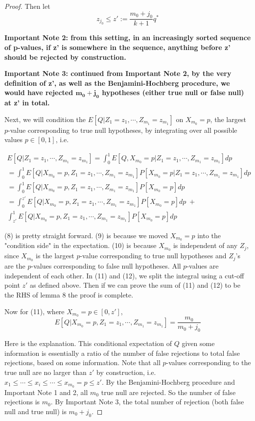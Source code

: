 \documentclass[12pt]{article}
\theoremstyle{plain}
\theoremstyle{definition}
\theoremstyle{remark}
\begin{document}
\begin{proof}
Then let\[
z_{j_0}\leq z':=\frac{m_0+j_0}{k+1}q^*
\]

\textbf{Important Note 2: from this setting, in an increasingly sorted sequence of p-values, if z' is somewhere in the sequence, anything before z' should be rejected by construction.}

\textbf{Important Note 3: continued from Important Note 2, by the very definition of z', as well as the Benjamini-Hochberg procedure, we would have rejected $\mathbf{m_0+j_0}$ hypotheses (either true null or false null) at z' in total.}

Next, we will condition the $E[Q|Z_1=z_1,\cdots,Z_{m_1}=z_{m_1}]$ on $X_{m_0}=p$, the largest $p$-value corresponding to true null hypotheses, by integrating over all possible values $p\in[0,1]$, i.e. 

\begin{gather}
E[Q|Z_1=z_1,\cdots,Z_{m_1}=z_{m_1}]=\int_0^1 E[Q,X_{m_0}=p|Z_1=z_1,\cdots,Z_{m_1}=z_{m_1}]dp\\
=\int_0^1E[Q|X_{m_0}=p,Z_1=z_1,\cdots,Z_{m_1}=z_{m_1}]P[X_{m_0}=p|Z_1=z_1,\cdots,Z_{m_1}=z_{m_1}]dp\\
=\int_0^1E[Q|X_{m_0}=p,Z_1=z_1,\cdots,Z_{m_1}=z_{m_1}]P[X_{m_0}=p]dp\\
=\int_0^{z'}E[Q|X_{m_0}=p,Z_1=z_1,\cdots,Z_{m_1}=z_{m_1}]P[X_{m_0}=p]dp\;+\\\int_{z'}^1E[Q|X_{m_0}=p,Z_1=z_1,\cdots,Z_{m_1}=z_{m_1}]P[X_{m_0}=p]dp
\end{gather}

(8) is pretty straight forward. (9) is because we moved $X_{m_0}=p$ into the "condition side" in the expectation. (10) is because $X_{m_0}$ is independent of any $Z_j$, since $X_{m_0}$ is the largest $p$-value corresponding to true null hypotheses and $Z_j$'s are the $p$-values corresponding to false null hypotheses. All $p$-values are independent of each other. In (11) and (12), we split the integral using a cut-off point $z'$ as defined above. Then if we can prove the sum of (11) and (12) to be the RHS of lemma 8 the proof is complete.

Now for (11), where $X_{m_0}=p\in [0,z']$, $$E[Q|X_{m_0}=p,Z_1=z_1,\cdots,Z_{m_1}=z_{m_1}]=\frac{m_0}{m_0+j_0}$$

Here is the explanation. This conditional expectation of $Q$ given some information is essentially a ratio of the number of false rejections to total false rejections, based on some information. Note that all $p$-values corresponding to the true null are no larger than $z'$ by construction, i.e. $x_1\leq \cdots\leq x_i\leq \cdots\leq x_{m_0}=p\leq z'$. By the Benjamini-Hochberg procedure and Important Note 1 and 2, all $m_0$ true null are rejected. So the number of false rejections is $m_0$. By Important Note 3, the total number of rejection (both false null and true null) is $m_0+j_0$. 


\end{proof}
\end{document}
